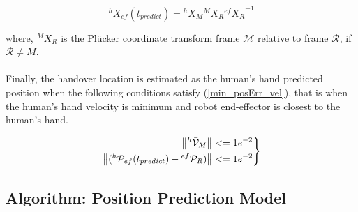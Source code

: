 \documentclass[a4paper, 12pt, oneside]{Thesis}  %
\begin{document}
\begin{equation}\label{X_ef_ht}
{}^{h}{X}_{ef}(t_{predict}) =  {}^{h}{X}_M  {}^{M}{X}_R {{}^{ef}{X}_R}^{-1}
\end{equation}

where, ${}^{M}{X}_R$ is the Pl\"ucker coordinate transform frame $\mathcal{M}$ relative to frame $\mathcal{R}$, if $\mathcal R \neq M$.

\paragraph*{}
Finally, the handover location is estimated as the human's hand predicted position when the following conditions satisfy (\ref{min_posErr_vel}), that is when the human's hand velocity is minimum and robot end-effector is closest to the human's hand.

\begin{equation}\label{min_posErr_vel}
\left.\begin{aligned}
\norm{{}^{h}\mathcal{\bar{V}}_{M}}& <= 1e^{-2} \\
\norm{({}^{h}\mathcal{P}_{ef}(t_{predict}) - {}^{ef}\mathcal{P}_{R})} & <= 1e^{-2}
\end{aligned}
\right\}
\end{equation}


\subsection{Algorithm: Position Prediction Model}
\end{document}
